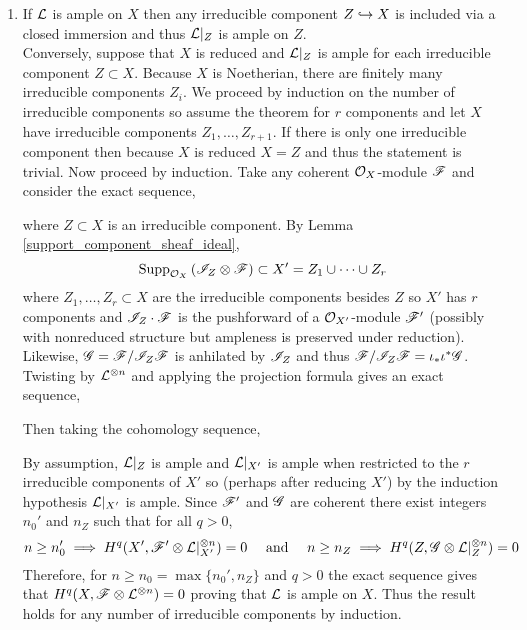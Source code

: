 \documentclass[12pt]{article}
\begin{document}
\begin{enumerate}
\item If $\mathcal{L}$ is ample on $X$ then any irreducible component $Z \hookrightarrow X$ is included via a closed immersion and thus $\mathcal{L}|_Z$ is ample on $Z$. 
\bigskip\\
Conversely, suppose that $X$ is reduced and $\mathcal{L}|_Z$ is ample for each irreducible component $Z \subset X$. Because $X$ is Noetherian, there are finitely many irreducible components $Z_i$. We proceed by induction on the number of irreducible components so assume the theorem for $r$ components and let $X$ have irreducible components $Z_1, \dots, Z_{r+1}$. 
If there is only one irreducible component then because $X$ is reduced $X = Z$ and thus the statement is trivial. Now proceed by induction. Take any coherent $\mathcal{O}_{X}$-module $\mathscr{F}$ and consider the exact sequence,
\begin{center}
\end{center}
where $Z \subset X$ is an irreducible component. By Lemma \ref{support_component_sheaf_ideal}, 
\[ \mathrm{Supp}_{\mathcal{O}_{X}}\left(\mathscr{I}_Z \otimes \mathscr{F} \right) \subset X' = Z_1 \cup \cdots \cup Z_r \]
where $Z_1, \dots, Z_r \subset X$ are the irreducible components besides $Z$ so $X'$ has $r$ components and $\mathscr{I}_{Z} \cdot \mathscr{F}$ is the pushforward of a $\mathcal{O}_{X'}$-module $\mathscr{F}'$ (possibly with nonreduced structure but ampleness is preserved under reduction). Likewise, $\mathscr{G} = \mathscr{F} / \mathscr{I}_Z \mathscr{F}$ is anhilated by $\mathscr{I}_Z$ and thus $\mathscr{F} / \mathscr{I}_Z \mathscr{F} = \iota_* \iota^* \mathscr{G}$. Twisting by $\mathcal{L}^{\otimes n}$ and applying the projection formula gives an exact sequence,
\begin{center}
\end{center}
Then taking the cohomology sequence,
\begin{center}
\end{center}
By assumption, $\mathcal{L}|_Z$ is ample and $\mathcal{L}|_{X'}$ is ample when restricted to the $r$ irreducible components of $X'$ so (perhaps after reducing $X'$) by the induction hypothesis $\mathcal{L}|_{X'}$ is ample. Since $\mathscr{F}'$ and $\mathscr{G}$ are coherent there exist integers $n_0'$ and $n_Z$ such that for all $q > 0$,
\[ n \ge n_0' \implies H^q(X', \mathscr{F}' \otimes \mathcal{L}|_{X'}^{\otimes n}) = 0 \quad \text{ and } \quad n \ge n_Z \implies H^q(Z, \mathscr{G} \otimes \mathcal{L}|_{Z}^{\otimes n}) = 0 \]
Therefore, for $n \ge n_0 = \max\{n_0', n_Z\}$ and $q > 0$ the exact sequence gives that $H^q(X, \mathscr{F} \otimes \mathcal{L}^{\otimes n}) = 0$ proving that $\mathcal{L}$ is ample on $X$. Thus the result holds for any number of irreducible components by induction.


\end{enumerate}
\end{document}
